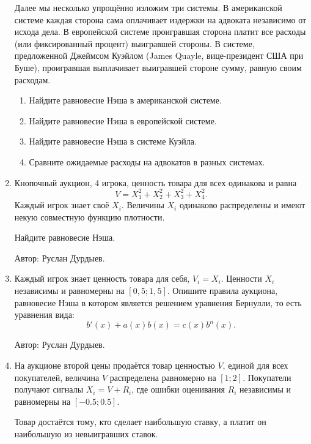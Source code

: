 \begin{enumerate}
Далее мы несколько упрощённо изложим три системы. В американской системе каждая сторона сама оплачивает издержки на адвоката независимо от исхода дела. В европейской системе проигравшая сторона платит все расходы (или фиксированный процент) выигравшей стороны. В системе, предложенной Джеймсом Куэйлом (James Quayle, вице-президент США при Буше), проигравшая выплачивает выигравшей стороне сумму, равную своим расходам.
\begin{enumerate}
\item Найдите равновесие Нэша в американской системе.
\item Найдите равновесие Нэша в европейской системе.
\item Найдите равновесие Нэша в системе Куэйла.
\item Сравните ожидаемые расходы на адвокатов в разных системах.
\end{enumerate}


\item Кнопочный аукцион, 4 игрока, ценность товара для всех одинакова и равна
\begin{equation}
V=X_{1}^{2}+X_{2}^{2}+X_{3}^{2}+X_{4}^{2}.
\end{equation}
Каждый игрок знает своё $X_{i}$. Величины $X_{i}$ одинаково распределены и имеют некую совместную функцию плотности.

Найдите равновесие Нэша.

Автор: Руслан Дурдыев.

\item Каждый игрок знает ценность товара для себя, $V_{i}=X_{i}$. Ценности $X_{i}$ независимы и равномерны на $[0,5;1,5]$. Опишите правила аукциона, равновесие Нэша в котором является решением уравнения Бернулли, то есть уравнения вида:
\begin{equation}
b'(x)+a(x)b(x)=c(x)b^{n}(x).
\end{equation}

Автор: Руслан Дурдыев.

\item На аукционе второй цены продаётся товар ценностью $V$, единой для всех покупателей, величина $V$ распределена равномерно на $[1;2]$. Покупатели получают сигналы $X_{i}=V+R_{i}$, где ошибки оценивания $R_{i}$ независимы и равномерны на $[-0.5;0.5]$. 

Товар достаётся тому, кто сделает наибольшую ставку, а платит он наибольшую из невыигравших ставок.


\end{enumerate}
